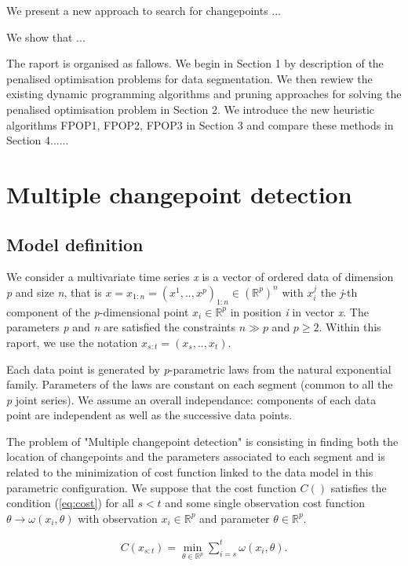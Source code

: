 \documentclass[a4paper,12pt]{article}
\begin{document}
	We present a new approach to search for changepoints ...
	
	We show that ...
	
	The raport is organised as fallows. We begin in Section 1 by description of the penalised optimisation problems for data segmentation. We then rewiew the existing dynamic programming algorithms and pruning approaches for solving the penalised optimisation problem in Section 2. We introduce the new heuristic algorithms FPOP1, FPOP2, FPOP3 in Section 3 and compare these methods in Section 4......
	\newpage 
	
	\section{ Multiple changepoint detection}
	\label{section1}
		\subsection{Model definition}
		\label{Model definition}
		
		We consider a multivariate time series \textit{x} is a vector of ordered data of dimension \textit{p} and size \textit{n}, that is $x = x_{1:n} = (x^1,.., x^p)_{1:n}\in(\mathbb{R}^p)^n$ with $x_i^j$ the \textit{j}-th component of the \textit{p}-dimensional point  $x_i\in\mathbb{R}^p$ in position \textit{i} in vector \textit{x}.  The parameters \textit{p} and \textit{n} are satisfied the constraints $n \gg p$ and $p\ge 2$. Within this raport, we use the notation  $x _{s:t} = (x_s,.., x_t)$.
		
		Each data point is generated by \textit{p}-parametric laws from the natural exponential family. Parameters of the laws are constant on each segment (common to all the \textit{p} joint series). We assume an overall independance: components of each data point are independent as well as the successive data points.
		
		The problem of "Multiple changepoint detection" is consisting in finding both the location of changepoints and the parameters associated to each segment and is related to the minimization of cost function linked to the data model in this parametric configuration. We suppose that the cost function $C()$ satisfies the condition (\ref*{eq:cost}) for all $s < t$ and some single observation cost function $\theta \rightarrow \omega(x_i,\theta)$ with observation $x_i\in \mathbb{R}^p$ and parameter $\theta \in \mathbb{R}^p$.
		
		\begin{equation}
			\begin{gathered}
			C(x_{s:t}) = \min_{\theta \in \mathbb{R}^p} \sum_{i=s}^{t}\omega(x_i,\theta).
			\end{gathered}
			\label{eq:cost}
		\end{equation}
	
\end{document}
